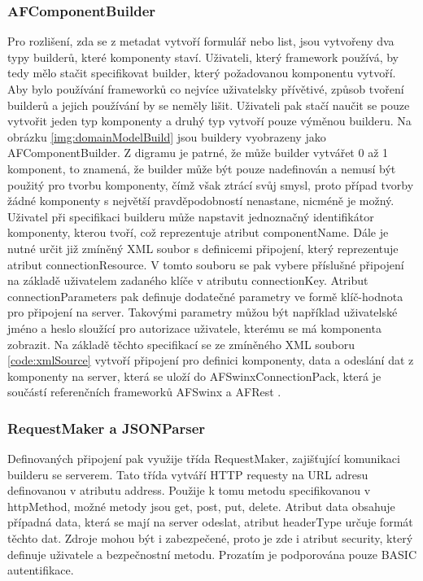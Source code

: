 \subsubsection{AFComponentBuilder}
Pro rozlišení, zda se z metadat vytvoří formulář nebo list, jsou vytvořeny dva typy builderů, které komponenty staví. Uživateli, který framework používá, by tedy mělo stačit specifikovat builder, který požadovanou komponentu vytvoří. Aby bylo používání frameworků co nejvíce uživatelsky přívětivé, způsob tvoření builderů a jejich používání by se neměly lišit. Uživateli pak stačí naučit se pouze vytvořit jeden typ komponenty a druhý typ vytvoří pouze výměnou builderu. Na obrázku \ref{img:domainModelBuild} jsou buildery vyobrazeny jako AFComponentBuilder. Z digramu je patrné, že může builder vytvářet 0 až 1 komponent, to znamená, že builder může být pouze nadefinován a nemusí být použitý pro tvorbu komponenty, čímž však ztrácí svůj smysl, proto případ tvorby žádné komponenty s největší pravděpodobností nenastane, nicméně je možný. Uživatel při specifikaci builderu může napstavit jednoznačný identifikátor komponenty, kterou tvoří, což reprezentuje atribut componentName. Dále je nutné určit již zmíněný XML soubor s definicemi připojení, který reprezentuje atribut connectionResource. V tomto souboru se pak vybere příslušné připojení na základě uživatelem zadaného klíče v atributu connectionKey. Atribut connectionParameters pak definuje dodatečné parametry ve formě klíč-hodnota pro připojení na server. Takovými parametry můžou být například uživatelské jméno a heslo sloužící pro autorizace uživatele, kterému se má komponenta zobrazit. Na základě těchto specifikací se ze zmíněného XML souboru \ref{code:xmlSource} vytvoří připojení pro definici komponenty, data a odeslání dat z komponenty na server, která se uloží do AFSwinxConnectionPack, která je součástí referenčních frameworků AFSwinx a AFRest \cite{tomasek-thesis}.

\subsubsection{RequestMaker a JSONParser}
Definovaných připojení pak využije třída RequestMaker, zajišťující komunikaci builderu se serverem. Tato třída vytváří HTTP requesty na URL adresu definovanou v atributu address. Použije k tomu metodu specifikovanou v httpMethod, možné metody jsou get, post, put, delete. Atribut data obsahuje případná data, která se mají na server odeslat, atribut headerType určuje formát těchto dat. Zdroje mohou být i zabezpečené, proto je zde i atribut security, který definuje uživatele a bezpečnostní metodu. Prozatím je podporována pouze BASIC autentifikace.


